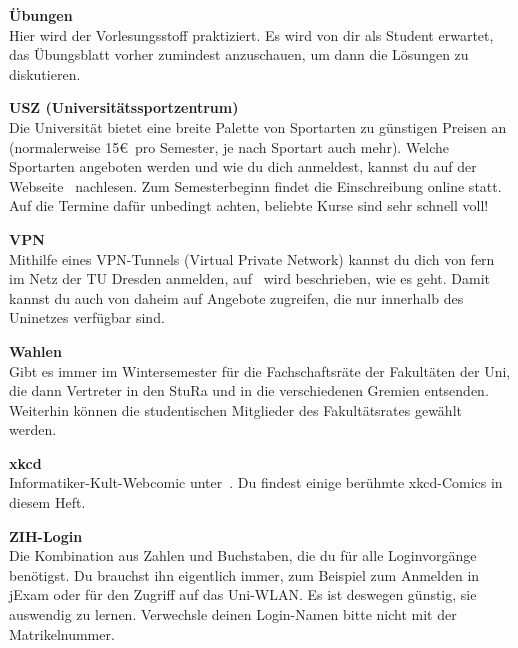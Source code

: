 \begin{multicols}{2}
\textbf{Übungen} \\
Hier wird der Vorlesungsstoff praktiziert.
Es wird von dir als Student erwartet, das Übungsblatt vorher zumindest anzuschauen, um dann die Lösungen zu diskutieren.

\textbf{USZ (Universitätssportzentrum)} \\
Die Universität bietet eine breite Palette von Sportarten zu günstigen Preisen an (normalerweise 15\euro\ pro Semester, je nach Sportart auch mehr).
Welche Sportarten angeboten werden und wie du dich anmeldest, kannst du auf der Webseite~ nachlesen.
Zum Semesterbeginn findet die Einschreibung online statt.
Auf die Termine dafür unbedingt achten, beliebte Kurse sind sehr schnell voll!

% 

\textbf{VPN}\\
Mithilfe eines VPN-Tunnels (Virtual Private Network) kannst du dich von fern im Netz der TU Dresden anmelden, auf~ wird beschrieben, wie es geht.
Damit kannst du auch von daheim auf Angebote zugreifen, die nur innerhalb des Uninetzes verfügbar sind.

\textbf{Wahlen} \\
Gibt es immer im Wintersemester für die Fachschaftsräte der Fakultäten der Uni, die dann Vertreter in den StuRa und in die verschiedenen Gremien entsenden.
Weiterhin können die studentischen Mitglieder des Fakultätsrates gewählt werden.

\textbf{xkcd} \\
Informatiker-Kult-Webcomic unter~. Du findest einige berühmte xkcd-Comics in diesem Heft.


\textbf{ZIH-Login} \\
Die Kombination aus Zahlen und Buchstaben, die du für alle Loginvorgänge
benötigst. Du brauchst ihn eigentlich immer, zum Beispiel zum Anmelden in jExam
oder für den Zugriff auf das Uni-WLAN\@. Es ist deswegen günstig, sie auswendig
zu lernen. Verwechsle deinen Login-Namen bitte nicht mit der Matrikelnummer.

\end{multicols}

